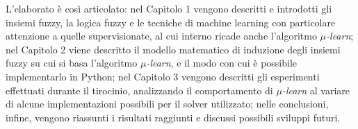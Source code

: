 \documentclass[12pt, letterpaper, twoside]{article}
\begin{document}
L'elaborato è così articolato: nel Capitolo 1 vengono descritti e introdotti gli insiemi fuzzy, la logica fuzzy e le tecniche di machine learning con particolare attenzione a quelle supervisionate, al cui interno ricade anche l'algoritmo \textit{$\mu$-learn}; nel Capitolo 2 viene descritto il modello matematico di induzione degli insiemi fuzzy su cui si basa l'algoritmo \textit{$\mu$-learn}, e il modo con cui è possibile implementarlo in Python; nel Capitolo 3 vengono descritti gli esperimenti effettuati durante il tirocinio, analizzando il comportamento di \textit{$\mu$-learn} al variare di alcune implementazioni possibili per il solver utilizzato; nelle conclusioni, infine, vengono riassunti i risultati raggiunti e discussi possibili sviluppi futuri.
\end{document}
